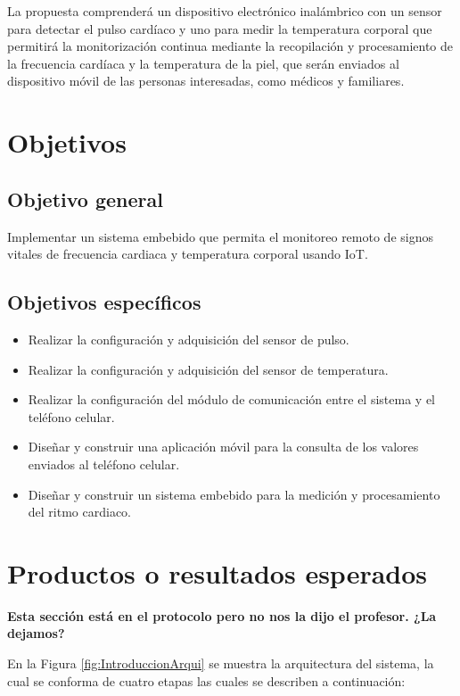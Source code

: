 La propuesta comprenderá un dispositivo electrónico inalámbrico con un sensor para detectar el pulso cardíaco y uno para medir la temperatura corporal que permitirá la monitorización continua mediante la recopilación y procesamiento de la frecuencia cardíaca y la temperatura de la piel, que serán enviados al dispositivo móvil de las personas interesadas, como médicos y familiares.

\section{Objetivos}
\subsection{Objetivo general}
Implementar un sistema embebido que permita el monitoreo remoto de signos vitales de frecuencia cardiaca y temperatura corporal usando IoT.
\subsection{Objetivos específicos}
	\begin{itemize}
		\item Realizar la configuración y adquisición del sensor de pulso.
		\item Realizar la configuración y adquisición del sensor de temperatura.
		\item Realizar la configuración del módulo de comunicación entre el sistema y el teléfono celular.
		\item Diseñar y construir una aplicación móvil para la consulta de los valores enviados al teléfono celular.
		\item Diseñar y construir un sistema embebido para la medición y procesamiento del ritmo cardiaco.
	\end{itemize}	

\section{Productos o resultados esperados}
\textbf{Esta sección está en el protocolo pero no nos la dijo el profesor. ¿La dejamos?}

En la Figura \ref{fig:IntroduccionArqui} se muestra la arquitectura del sistema, la cual se conforma de cuatro etapas las cuales se describen a continuación:


